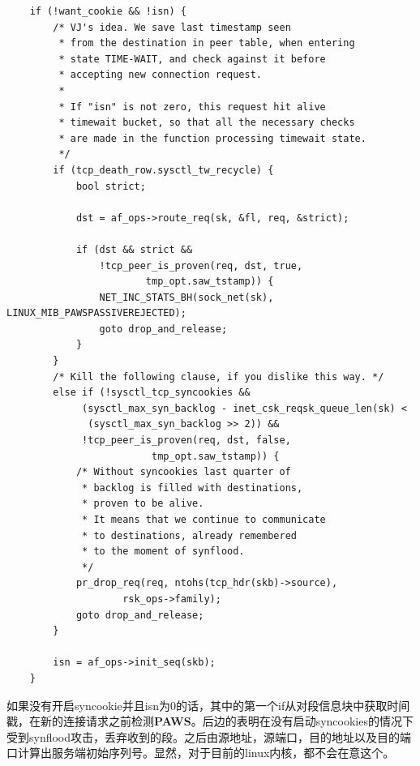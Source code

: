 \begin{verbatim}
    if (!want_cookie && !isn) {
        /* VJ's idea. We save last timestamp seen
         * from the destination in peer table, when entering
         * state TIME-WAIT, and check against it before
         * accepting new connection request.
         *
         * If "isn" is not zero, this request hit alive
         * timewait bucket, so that all the necessary checks
         * are made in the function processing timewait state.
         */
        if (tcp_death_row.sysctl_tw_recycle) {
            bool strict;

            dst = af_ops->route_req(sk, &fl, req, &strict);

            if (dst && strict &&
                !tcp_peer_is_proven(req, dst, true,
                        tmp_opt.saw_tstamp)) {
                NET_INC_STATS_BH(sock_net(sk), LINUX_MIB_PAWSPASSIVEREJECTED);
                goto drop_and_release;
            }
        }
        /* Kill the following clause, if you dislike this way. */
        else if (!sysctl_tcp_syncookies &&
             (sysctl_max_syn_backlog - inet_csk_reqsk_queue_len(sk) <
              (sysctl_max_syn_backlog >> 2)) &&
             !tcp_peer_is_proven(req, dst, false,
                         tmp_opt.saw_tstamp)) {
            /* Without syncookies last quarter of
             * backlog is filled with destinations,
             * proven to be alive.
             * It means that we continue to communicate
             * to destinations, already remembered
             * to the moment of synflood.
             */
            pr_drop_req(req, ntohs(tcp_hdr(skb)->source),
                    rsk_ops->family);
            goto drop_and_release;
        }

        isn = af_ops->init_seq(skb);
    }
\end{verbatim}

        如果没有开启syncookie并且isn为0的话，其中的第一个if从对段信息块中获取时间戳，在新的连接请求之前检测\textbf{PAWS}。后边的表明在没有启动syncookies的情况下受到synflood攻击，丢弃收到的段。之后由源地址，源端口，目的地址以及目的端口计算出服务端初始序列号。显然，对于目前的linux内核，都不会在意这个。

